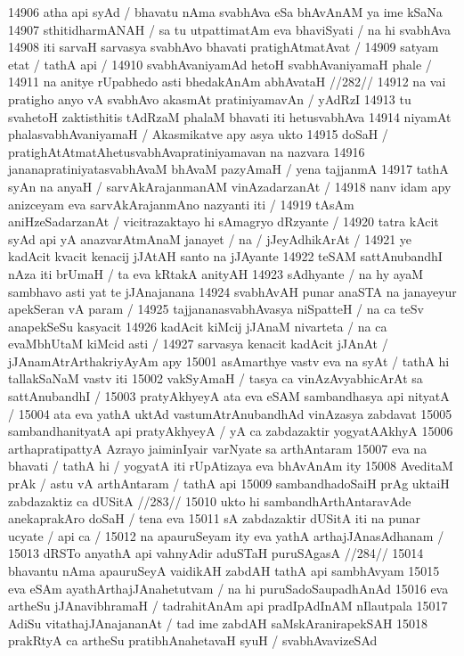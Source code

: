 14906 atha api syAd / bhavatu nAma svabhAva eSa bhAvAnAM ya ime kSaNa 
14907 sthitidharmANAH / sa tu utpattimatAm eva bhaviSyati / na hi svabhAva 
14908 iti sarvaH sarvasya svabhAvo bhavati pratighAtmatAvat / 
14909 satyam etat / tathA api /
14910 	svabhAvaniyamAd hetoH svabhAvaniyamaH phale / 
14911 	na anitye rUpabhedo asti bhedakAnAm abhAvataH //282//  
14912 na vai pratigho anyo vA svabhAvo akasmAt pratiniyamavAn / yAdRzI 
14913 tu svahetoH zaktisthitis tAdRzaM phalaM bhavati iti  hetusvabhAva
14914 niyamAt phalasvabhAvaniyamaH / Akasmikatve apy asya ukto 
14915 doSaH / pratighAtAtmatAhetusvabhAvapratiniyamavan na nazvara 
14916 jananapratiniyatasvabhAvaM bhAvaM pazyAmaH / yena tajjanmA
14917 tathA syAn na anyaH / sarvAkArajanmanAM vinAzadarzanAt / 
14918 nanv idam apy anizceyam eva sarvAkArajanmAno nazyanti iti /
14919 tAsAm aniHzeSadarzanAt / vicitrazaktayo hi sAmagryo dRzyante /
14920 tatra kAcit syAd api yA anazvarAtmAnaM janayet / na / jJeyAdhikArAt /
14921 ye kadAcit kvacit kenacij jJAtAH santo na jJAyante  
14922 teSAM sattAnubandhI nAza iti brUmaH / ta eva kRtakA anityAH
14923 sAdhyante / na hy ayaM sambhavo asti yat te jJAnajanana
14924 svabhAvAH punar anaSTA na janayeyur apekSeran vA param /  
14925 tajjananasvabhAvasya niSpatteH / na ca teSv anapekSeSu kasyacit  
14926 kadAcit kiMcij jJAnaM nivarteta / na ca evaMbhUtaM kiMcid asti / 
14927 sarvasya kenacit kadAcit jJAnAt / jJAnamAtrArthakriyAyAm apy 
15001 asAmarthye vastv eva na syAt / tathA hi tallakSaNaM vastv iti
15002 vakSyAmaH / tasya ca vinAzAvyabhicArAt sa sattAnubandhI / 
15003 	pratyAkhyeyA ata eva eSAM sambandhasya api nityatA / 
15004 ata eva yathA uktAd vastumAtrAnubandhAd vinAzasya zabdavat 
15005 sambandhanityatA api pratyAkhyeyA / yA ca zabdazaktir yogyatAAkhyA
15006 arthapratipattyA Azrayo jaiminIyair varNyate sa arthAntaram
15007 eva na bhavati / tathA hi / yogyatA iti rUpAtizaya eva bhAvAnAm ity
15008 AveditaM prAk / astu vA arthAntaram / tathA api
15009 	sambandhadoSaiH prAg uktaiH zabdazaktiz ca dUSitA //283// 
15010 ukto hi sambandhArthAntaravAde anekaprakAro doSaH / tena eva
15011 sA zabdazaktir dUSitA iti na punar ucyate / api ca /
15012 	na apauruSeyam ity eva yathA arthajJAnasAdhanam /
15013 	dRSTo anyathA api vahnyAdir aduSTaH puruSAgasA //284//  
15014 bhavantu nAma apauruSeyA vaidikAH zabdAH tathA api sambhAvyam 
15015 eva eSAm ayathArthajJAnahetutvam / na hi puruSadoSaupadhAnAd  
15016 eva artheSu jJAnavibhramaH / tadrahitAnAm api pradIpAdInAM nIlautpala
15017 AdiSu vitathajJAnajananAt / tad ime zabdAH saMskAranirapekSAH 
15018 prakRtyA ca artheSu pratibhAnahetavaH syuH / svabhAvavizeSAd  
